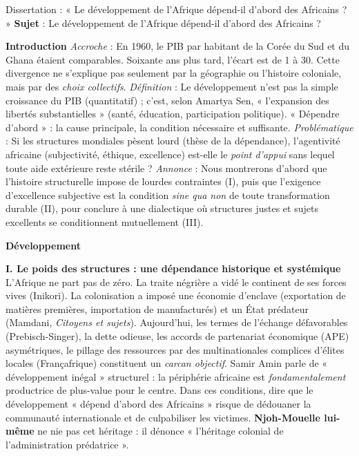 \documentclass[11pt]{article}
\begin{document}
\begin{exoresolu}{Dissertation : « Le développement de l'Afrique dépend-il d'abord des Africains ? »}
\textbf{Sujet} : Le développement de l'Afrique dépend-il d'abord des Africains ?

\textbf{Introduction}
\emph{Accroche} : En 1960, le PIB par habitant de la Corée du Sud et du Ghana étaient comparables. Soixante ans plus tard, l'écart est de 1 à 30. Cette divergence ne s'explique pas seulement par la géographie ou l'histoire coloniale, mais par des \emph{choix collectifs}.
\emph{Définition} : Le développement n'est pas la simple croissance du PIB (quantitatif) ; c'est, selon Amartya Sen, « l'expansion des libertés substantielles » (santé, éducation, participation politique). « Dépendre d'abord » : la cause principale, la condition nécessaire et suffisante.
\emph{Problématique} : Si les structures mondiales pèsent lourd (thèse de la dépendance), l'agentivité africaine (subjectivité, éthique, excellence) est-elle le \emph{point d'appui} sans lequel toute aide extérieure reste stérile ?
\emph{Annonce} : Nous montrerons d'abord que l'histoire structurelle impose de lourdes contraintes (I), puis que l'exigence d'excellence subjective est la condition \emph{sine qua non} de toute transformation durable (II), pour conclure à une dialectique où structures justes et sujets excellents se conditionnent mutuellement (III).

\textbf{Développement}

\textbf{I. Le poids des structures : une dépendance historique et systémique}
L'Afrique ne part pas de zéro. La traite négrière a vidé le continent de ses forces vives (Inikori). La colonisation a imposé une économie d'enclave (exportation de matières premières, importation de manufacturés) et un État prédateur (Mamdani, \emph{Citoyens et sujets}). Aujourd'hui, les termes de l'échange défavorables (Prebisch-Singer), la dette odieuse, les accords de partenariat économique (APE) asymétriques, le pillage des ressources par des multinationales complices d'élites locales (Françafrique) constituent un \emph{carcan objectif}. Samir Amin parle de « développement inégal » structurel : la périphérie africaine est \emph{fondamentalement} productrice de plus-value pour le centre. Dans ces conditions, dire que le développement « dépend d'abord des Africains » risque de dédouaner la communauté internationale et de culpabiliser les victimes. \textbf{Njoh-Mouelle lui-même} ne nie pas cet héritage : il dénonce « l'héritage colonial de l'administration prédatrice ».


\end{exoresolu}
\end{document}

